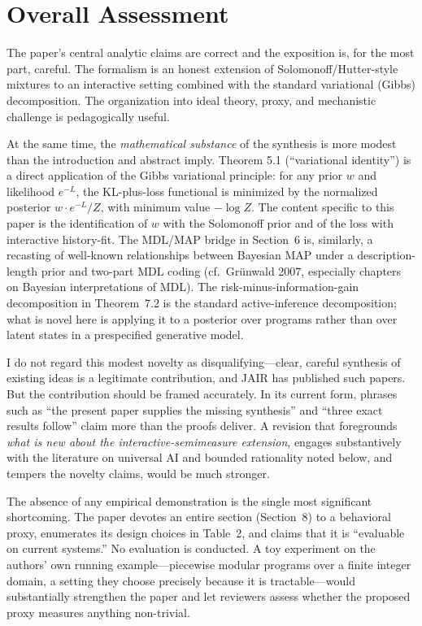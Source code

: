 \documentclass[11pt]{article}
\begin{document}
\section*{Overall Assessment}

The paper's central analytic claims are correct and the exposition is, for the most part, careful. The formalism is an honest extension of Solomonoff/Hutter-style mixtures to an interactive setting combined with the standard variational (Gibbs) decomposition. The organization into ideal theory, proxy, and mechanistic challenge is pedagogically useful.

At the same time, the \emph{mathematical substance} of the synthesis is more modest than the introduction and abstract imply. Theorem 5.1 (``variational identity'') is a direct application of the Gibbs variational principle: for any prior $w$ and likelihood $e^{-L}$, the KL-plus-loss functional is minimized by the normalized posterior $w\cdot e^{-L}/Z$, with minimum value $-\log Z$. The content specific to this paper is the identification of $w$ with the Solomonoff prior and of the loss with interactive history-fit. The MDL/MAP bridge in Section~6 is, similarly, a recasting of well-known relationships between Bayesian MAP under a description-length prior and two-part MDL coding (cf.\ Gr\"unwald 2007, especially chapters on Bayesian interpretations of MDL). The risk-minus-information-gain decomposition in Theorem~7.2 is the standard active-inference decomposition; what is novel here is applying it to a posterior over programs rather than over latent states in a prespecified generative model.

I do not regard this modest novelty as disqualifying---clear, careful synthesis of existing ideas is a legitimate contribution, and JAIR has published such papers. But the contribution should be framed accurately. In its current form, phrases such as ``the present paper supplies the missing synthesis'' and ``three exact results follow'' claim more than the proofs deliver. A revision that foregrounds \emph{what is new about the interactive-semimeasure extension}, engages substantively with the literature on universal AI and bounded rationality noted below, and tempers the novelty claims, would be much stronger.

The absence of any empirical demonstration is the single most significant shortcoming. The paper devotes an entire section (Section~8) to a behavioral proxy, enumerates its design choices in Table~2, and claims that it is ``evaluable on current systems.'' No evaluation is conducted. A toy experiment on the authors' own running example---piecewise modular programs over a finite integer domain, a setting they choose precisely because it is tractable---would substantially strengthen the paper and let reviewers assess whether the proposed proxy measures anything non-trivial.
\end{document}
